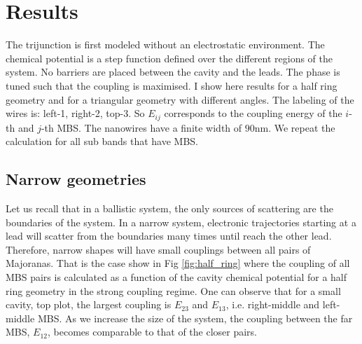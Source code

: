 \documentclass[10pt,twocolumn,aps,superscriptaddress, floatfix,notitlepage]{revtex4-1}
\begin{document}
\section{Results}

The trijunction is first modeled without an electrostatic environment. The chemical potential is a step function defined over the different regions of the system. No barriers are placed between the cavity and the leads. The phase is tuned such that the coupling is maximised. I show here results for a half ring geometry and for a triangular geometry with different angles. The labeling of the wires is: left-1, right-2, top-3. So $E_{ij}$ corresponds to the coupling energy of the $i$-th and $j$-th MBS. The nanowires have a finite width of $90$nm. We repeat the calculation for all sub bands that have MBS.

\subsection{Narrow geometries}

Let us recall that in a ballistic system, the only sources of scattering are the boundaries of the system. In a narrow system, electronic trajectories starting at a lead will scatter from the boundaries many times until reach the other lead. Therefore, narrow shapes will have small couplings between all pairs of Majoranas. That is the case show in Fig \ref{fig:half_ring} where the coupling of all MBS pairs is calculated as a function of the cavity chemical potential for a half ring geometry in the strong coupling regime. One can observe that for a small cavity, top plot, the largest coupling is $E_{23}$ and $E_{13}$, i.e. right-middle and left-middle MBS. As we increase the size of the system, the coupling between the far MBS, $E_{12}$, becomes comparable to that of the closer pairs.
\end{document}
